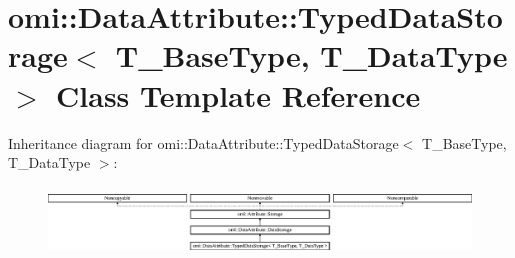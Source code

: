 \hypertarget{classomi_1_1_data_attribute_1_1_typed_data_storage}{}\section{omi\+:\+:Data\+Attribute\+:\+:Typed\+Data\+Storage$<$ T\+\_\+\+Base\+Type, T\+\_\+\+Data\+Type $>$ Class Template Reference}
\label{classomi_1_1_data_attribute_1_1_typed_data_storage}
Inheritance diagram for omi\+:\+:Data\+Attribute\+:\+:Typed\+Data\+Storage$<$ T\+\_\+\+Base\+Type, T\+\_\+\+Data\+Type $>$\+:\begin{figure}[H]
\begin{center}
\leavevmode
\includegraphics[height=1.866667cm]{classomi_1_1_data_attribute_1_1_typed_data_storage}
\end{center}
\end{figure}
